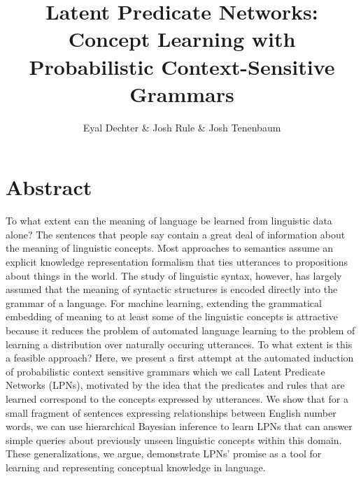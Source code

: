 \documentclass[11pt, twocolumn]{article}
\title{Latent Predicate Networks: Concept Learning with Probabilistic Context-Sensitive Grammars}
\author{Eyal Dechter \& Josh Rule \& Josh Tenenbaum}
\begin{document}
\maketitle

\section{Abstract}
To what extent can the meaning of language be learned from linguistic
data alone?  The sentences that people say contain a great deal of
information about the meaning of linguistic concepts. Most approaches
to semantics assume an explicit knowledge representation formalism
that ties utterances to propositions about things in the world. The
study of linguistic syntax, however, has largely assumed that the
meaning of syntactic structures is encoded directly into the grammar
of a language. For machine learning, extending the grammatical
embedding of meaning to at least some of the linguistic concepts is
attractive because it reduces the problem of automated language
learning to the problem of learning a distribution over naturally
occuring utterances. To what extent is this a feasible approach? Here,
we present a first attempt at the automated induction of probabilistic
context sensitive grammars which we call Latent Predicate Networks
(LPNs), motivated by the idea that the predicates and rules that are
learned correspond to the concepts expressed by utterances. We show
that for a small fragment of sentences expressing relationships
between English number words, we can use hierarchical Bayesian
inference to learn LPNs that can answer simple queries about
previously unseen linguistic concepts within this domain. These
generalizations, we argue, demonstrate LPNs' promise as a tool for
learning and representing conceptual knowledge in language.

\end{document}
